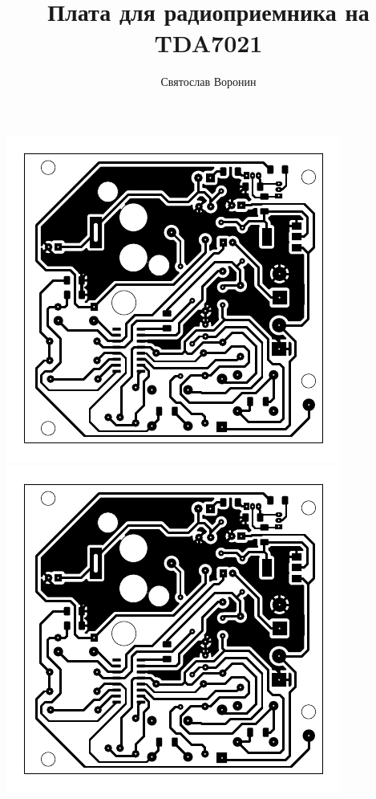 \documentclass[12pt,a4paper]{article}
\title{Плата для радиоприемника на TDA7021}
\author{Святослав Воронин}
\begin{document}
\pagestyle{empty}

\noindent
	\includegraphics{receiver-crop.pdf}
	\includegraphics{receiver-crop.pdf}\hfill
\end{document}
